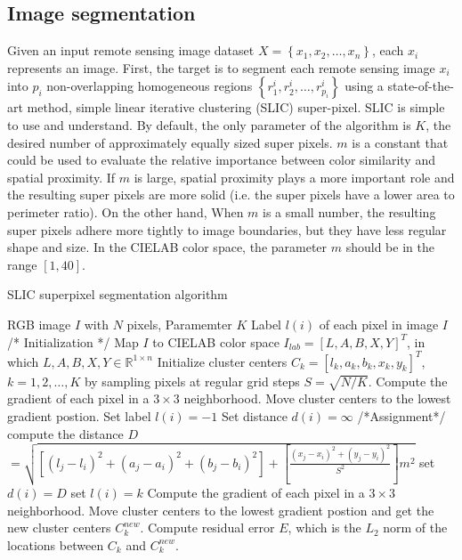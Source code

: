 \documentclass[11pt]{article}
\begin{document}
\subsection{Image segmentation}
Given an input remote sensing image dataset $X=\left\{x_1,x_2,\dots,x_n\right\}$, each $x_i$ represents an image. First, the target is to segment each remote sensing image $x_i$ into $p_i$ non-overlapping homogeneous regions $\left\{r_1^i,r_2^i,\dots,r_{p_i}^i\right\}$ using a state-of-the-art method, simple linear iterative clustering (SLIC) super-pixel. SLIC is simple to use and understand. By default, the only parameter of the algorithm is $K$, the desired number of approximately equally sized super pixels. $m$ is a constant that could be used to evaluate the relative importance between color similarity and spatial proximity. If $m$ is large, spatial proximity plays a more important role and the resulting super pixels are more solid (i.e. the super pixels have a lower area to perimeter ratio). On the other hand, When $m$ is a small number, the resulting super pixels adhere more tightly to image boundaries, but they have less regular shape and size. In the CIELAB color space, the parameter $m$ should be in the range $\left[1,40\right]$.

\renewcommand{\algorithmicrequire}{\textbf{Input}}  
\renewcommand{\algorithmicensure}{\textbf{Output}}  
\begin{algorithm}  
\caption{SLIC superpixel segmentation algorithm}
\begin{algorithmic}
\Require RGB image $I$ with $N$ pixels, Paramemter $K$
\Ensure Label $l(i)$ of each pixel in image $I$
\State
\State /* Initialization */
\State Map $I$ to CIELAB color space $I_{lab}=\left[L,A,B,X,Y\right]^T$, in which $L,A,B,X,Y\in\mathbb{R}^{1\times n}$
\State Initialize cluster centers $C_k=\left[l_k,a_k,b_k,x_k,y_k\right]^T$, $k=1,2,\dots,K$ by sampling pixels at regular grid steps $S=\sqrt{N/K}$.
\State Compute the gradient of each pixel in a $3\times3$ neighborhood.
\State Move cluster centers to the lowest gradient postion.
\EndFor
{}
\State Set label $l(i)=-1$
\State Set distance $d(i)=\infty$
\EndFor
\State
\State /*Assignment*/
\State compute the distance $D$
\State $=\sqrt{\left[(l_j-l_i)^2+(a_j-a_i)^2+(b_j-b_i)^2\right]+\left[\frac{(x_j-x_i)^2+(y_j-y_i)^2}{S^2}\right]m^2}$
\State set $d(i)=D$
\State set $l(i)=k$
\EndIf
\EndFor
\EndFor
{}
\State Compute the gradient of each pixel in a $3\times3$ neighborhood.
\State Move cluster centers to the lowest gradient postion and get the new cluster centers $C_k^{new}$.
\EndFor
\State Compute residual error $E$, which is the $L_2$ norm of the locations between $C_k$ and $C_k^{new}$.
\EndWhile
\end{algorithmic}  
\end{algorithm}  
\end{document}
